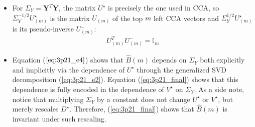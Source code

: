 \begin{itemize}
    \item For $\Sigma_Y = \mathbf{Y}^T \mathbf{Y}$, the matrix $U ^{\star}$ is precisely the one used in CCA, so $\Sigma_Y^{-1/2} U ^{\star}_{(m)}$ is the matrix $U_{(m)}$ of the top $m$ left CCA vectors and $\Sigma_Y^{1/2} U ^{\star}_{(m)}$ is its pseudo-inverse $U_{(m)} ^{-}$:
    \begin{eqnarray*}
        U_{(m)} ^{T} U_{(m)} ^{-} = \mathbb{I}_m
    \end{eqnarray*}
    \item Equation ($\ref{eq:3p21_e4}$) shows that $\hat{B}(m)$ depends on $\Sigma_Y$ both explicitly and implicitly via the dependence of $U ^{\star}$ through the generalized SVD decomposition (\ref{eq:3p21_e2}). Equation (\ref{eq:3p21_final}) shows that this dependence is fully encoded in the dependence of $V ^{\star}$ on $\Sigma_Y$. As a side note, notice that multiplying $\Sigma_Y$ by a constant does not change $U ^{\star}$ or $V ^{\star}$, but merely rescales $D ^{\star}$. Therefore, (\ref{eq:3p21_final}) shows that $\hat{B}(m)$ is invariant under such rescaling.
    

\end{itemize}
